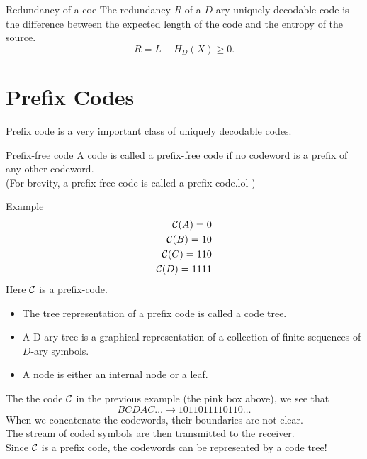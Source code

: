 \documentclass[../main.tex]{subfiles}
\begin{document}
    \begin{gbox}{Redundancy of a coe}
        The redundancy $R$ of a $D$-ary uniquely decodable code is the difference between the expected length of the code and the entropy of the source.\begin{equation*}
            R=L-H_D(X)\geq 0.
        \end{equation*}
    \end{gbox}
\section{Prefix Codes}
Prefix code is a very important class of uniquely decodable codes.
\begin{gbox}{Prefix-free code}
    A code is called a prefix-free code if no codeword is a prefix of any other codeword. \\
    (For brevity, a prefix-free code is called a prefix code.lol )
    \begin{pbox}{Example}
        \begin{align*}
            \mathcal{C}(A)=0\\
            \mathcal{C}(B)=10\\
            \mathcal{C}(C)=110\\
            \mathcal{C}(D)=1111
        \end{align*}
        Here $\mathcal{C}$ is a prefix-code.
    \end{pbox}
\end{gbox}
\begin{itemize}
    \item The tree representation of a prefix code is called a code tree.
    \item A D-ary tree is a graphical representation of a collection of finite sequences of $D$-ary symbols.
    \item A node is either an internal node or a leaf.
\end{itemize}
The the code $\mathcal{C}$ in the previous example (the pink box above), we see that 
\[
BCDAC\dots \to 1011011110110\dots
\]
When we concatenate the codewords, their boundaries are not clear.\\
The stream of coded symbols are then transmitted to the receiver. \\
Since $\mathcal{C}$ is a prefix code, the codewords can be represented by a code tree!
\end{document}
